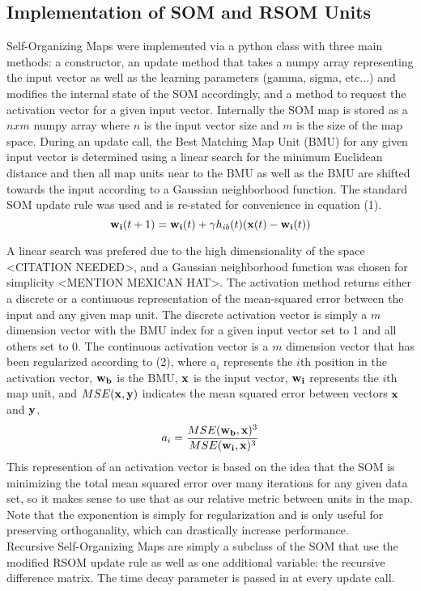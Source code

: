 \documentclass[a4paper,10pt]{article}
\begin{document}
\subsection{Implementation of SOM and RSOM Units}
Self-Organizing Maps were implemented via a python class with three main methods: a constructor,
an update method that takes a numpy array representing the input vector as well as the learning
parameters (gamma, sigma, etc...) and modifies the internal state of the SOM accordingly, and a
method to request the activation vector for a given input vector. Internally the SOM map is stored
as a $nxm$ numpy array where $n$ is the input vector size and $m$ is the size of the map space. 
During an update call, the Best Matching Map Unit (BMU) for any given input vector is determined
using a linear search for the minimum Euclidean distance and then all map units near to the BMU as
well as the BMU are shifted towards the input according to a Gaussian neighborhood function.  The
standard SOM update rule was used and is re-stated for convenience in equation (1).  
\begin{equation}
 \bold{w_{i}}(t+1) = \bold{w_i}(t) + \gamma h_{ib}(t)(\bold{x}(t)-\bold{w_i}(t))
\end{equation}

A linear search was prefered due to the high dimensionality of the space <CITATION NEEDED>, and a
Gaussian neighborhood function was chosen for simplicity <MENTION MEXICAN HAT>.  The activation
method returns either a discrete or a continuous representation of the mean-squared error between
the input and any given map unit. The discrete activation vector is simply a $m$ dimension vector
with the BMU index for a given input vector set to 1 and all others set to 0. The continuous
activation vector is a $m$ dimension vector that has been regularized according to (2), where $a_i$
represents the $i$th position in the activation vector, $\bold{w_b}$ is the BMU, $\bold{x}$ is the
input vector, $\bold{w_i}$ represents the $i$th map unit, and $MSE(\bold{x},\bold{y})$ indicates the
mean squared error between vectors $\bold{x}$ and $\bold{y}$.
\begin{equation}
 a_i = \frac{MSE(\bold{w_b}, \bold{x})^3}{MSE(\bold{w_i},\bold{x})^3}
\end{equation}
This represention of an activation vector is based on the idea that the SOM is minimizing the
total mean squared error over many iterations for any given data set, so it makes sense to use that
as our relative metric between units in the map.  Note that the exponention is simply for
regularization and is only useful for preserving orthoganality, which can drastically increase
performance.
\\
Recursive Self-Organizing Maps are simply a subclass of the SOM that use the modified RSOM update
rule as well as one additional variable: the recursive difference matrix.  The time decay parameter
is passed in at every update call.
\end{document}
